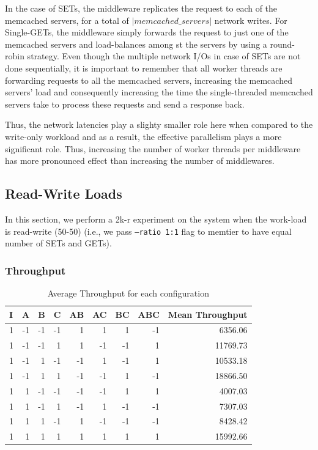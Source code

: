 \documentclass[11pt,a4paper]{article}
\begin{document}
In the case of SETs, the middleware replicates the request to each of the memcached servers, for a total of $| memcached\_servers|$ network writes. For Single-GETs, the middleware simply forwards the request to just one of the memcached servers and load-balances among st the servers by using a round-robin strategy. Even though the multiple network I/Os in case of SETs are not done sequentially, it is important to remember that all worker threads are forwarding requests to all the memcached servers, increasing the memcached servers' load and consequently increasing the time the single-threaded memcached servers take to process these requests and send a response back.

Thus, the network latencies play a slighty smaller role here when compared to the write-only workload and as a result, the effective parallelism plays a more significant role. Thus, increasing the number of worker threads per middleware has more pronounced effect than increasing the number of middlewares.

\subsection{Read-Write Loads}
In this section, we perform a 2k-r experiment on the system when the work-load is read-write (50-50) (i.e., we pass \texttt{--ratio 1:1} flag to memtier to have equal number of SETs and GETs). 
\subsubsection{Throughput}

\begin{table}[H]
	\caption{Average Throughput for each configuration}
	\centering
	\begin{tabular}{|r|r|r|r|r|r|r|r|r|}
		\hline
		\multicolumn{1}{|l|}{I} & \multicolumn{1}{l|}{A} & \multicolumn{1}{l|}{B} & \multicolumn{1}{l|}{C} & \multicolumn{1}{l|}{AB} & \multicolumn{1}{l|}{AC} & \multicolumn{1}{l|}{BC} & \multicolumn{1}{l|}{ABC} & \multicolumn{1}{l|}{Mean Throughput} \\ \hline
		1 & -1 & -1 & -1 & 1 & 1 & 1 & -1 & 6356.06 \\ \hline
		1 & -1 & -1 & 1 & 1 & -1 & -1 & 1 & 11769.73 \\ \hline
		1 & -1 & 1 & -1 & -1 & 1 & -1 & 1 & 10533.18 \\ \hline
		1 & -1 & 1 & 1 & -1 & -1 & 1 & -1 & 18866.50 \\ \hline
		1 & 1 & -1 & -1 & -1 & -1 & 1 & 1 & 4007.03 \\ \hline
		1 & 1 & -1 & 1 & -1 & 1 & -1 & -1 & 7307.03 \\ \hline
		1 & 1 & 1 & -1 & 1 & -1 & -1 & -1 & 8428.42 \\ \hline
		1 & 1 & 1 & 1 & 1 & 1 & 1 & 1 & 15992.66 \\ \hline
	\end{tabular}
	\label{}
\end{table}
\end{document}
